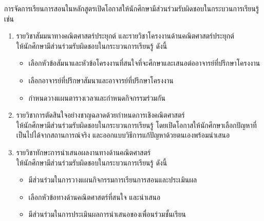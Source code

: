 {}

การจัดการเรียนการสอนในหลักสูตรเปิดโอกาสให้นักศึกษามีส่วนร่วมรับผิดชอบในกระบวนการเรียนรู้ เช่น

\begin{enumerate}
    \item รายวิชาสัมมนาทางคณิตศาสตร์ประยุกต์ และรายวิชาโครงงานด้านคณิตศาสตร์ประยุกต์  \\ให้นักศึกษามีส่วนร่วมรับผิดชอบในกระบวนการเรียนรู้  ดังนี้    
   \begin{itemize}
        \item เลือกหัวข้อสัมนาและหัวข้อโครงงานที่สนใจที่จะศึกษาและเสนอต่ออาจารย์ที่ปรึกษาโครงงาน
        \item เลือกอาจารย์ที่ปรึกษาสัมนาและอาจารย์ที่ปรึกษาโครงงาน
        \item กำหนดวางแผนตารางเวลาและกำหนดกิจกรรมร่วมกัน
    \end{itemize}
    \item รายวิชาการตัดสินใจอย่างชาญฉลาดด้วยกำหนดการเชิงคณิตศาสตร์ \\ให้นักศึกษามีส่วนร่วมรับผิดชอบในกระบวนการเรียนรู้  โดยเปิดโอกาสให้นักศึกษาเลือกปัญหาที่เป็นไปได้จากสถานการณ์จริง และออกแบบวิธีการแก้ปัญหาด้วยตนเองพร้อมนำเสนอ
    \item รายวิชาทักษะการนำเสนอผลงานทางด้านคณิตศาสตร์ \\ให้นักศึกษามีส่วนร่วมรับผิดชอบในกระบวนการเรียนรู้  ดังนี้  
    \begin{itemize}
    	\item มีส่วนร่วมในการวางแผนกิจกรรมการเรียนการสอนและประเมินผล
    	\item เลือกหัวข้อทางด้านคณิตศาสตร์ที่สนใจ และนำเสนอ
    	\item มีส่วนร่วมในการประเมินผลการนำเสนอของเพื่อนร่วมชั้นเรียน
    \end{itemize}
   

   \end{enumerate}
\begin{doclist}
\end{doclist}
